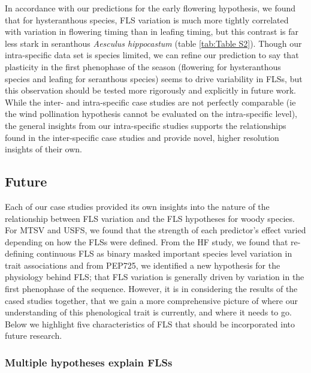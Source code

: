 \documentclass[12pt]{article}
\begin{document}
\indent In accordance with our predictions for the early flowering hypothesis, we found that for hysteranthous species, FLS variation is much more tightly correlated with variation in flowering timing than in leafing timing, but this contrast is far less stark in seranthous \textit{Aesculus hippocastum} (table \ref{tab:Table S2}). Though our intra-specific data set is species limited, we can refine our prediction to say that plasticity in the first phenophase of the season (flowering for hysteranthous species and leafing for seranthous species) seems to drive variability in FLSs, but this observation should be tested more rigorously and explicitly in future work. While the inter- and intra-specific case studies are not perfectly comparable (ie the wind pollination hypothesis cannot be evaluated on the intra-specific level), the general insights from our intra-specific studies supports the relationships found in the inter-specific case studies and provide novel, higher resolution insights of their own.

\subsection*{Future}
\indent\indent Each of our case studies provided its own insights into the nature of the relationship between FLS variation and the FLS hypotheses for woody species. For MTSV and USFS, we found that the strength of each predictor's effect varied depending on how the FLSs were defined. From the HF study, we found that re-defining  continuous FLS as binary masked important species level variation in trait associations and from PEP725, we identified a new hypothesis for the physiology behind FLS; that FLS variation is generally driven by variation in the first phenophase of the sequence. However, it is in considering the results of the cased studies together, that we gain a more comprehensive picture of where our understanding of this phenological trait is currently, and where it needs to go. Below we highlight five characteristics of FLS that should be incorporated into future research.
\subsubsection*{Multiple hypotheses explain FLSs}
\end{document}
